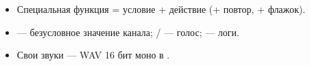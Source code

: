 \begin{summary}
\begin{itemize}
  \item Специальная функция = условие + действие (+ повтор, + флажок).
  \item {} --- безусловное значение канала; / ---
        голос;  --- логи.
  \item Свои звуки --- WAV 16 бит моно в .
\end{itemize}
\end{summary}
